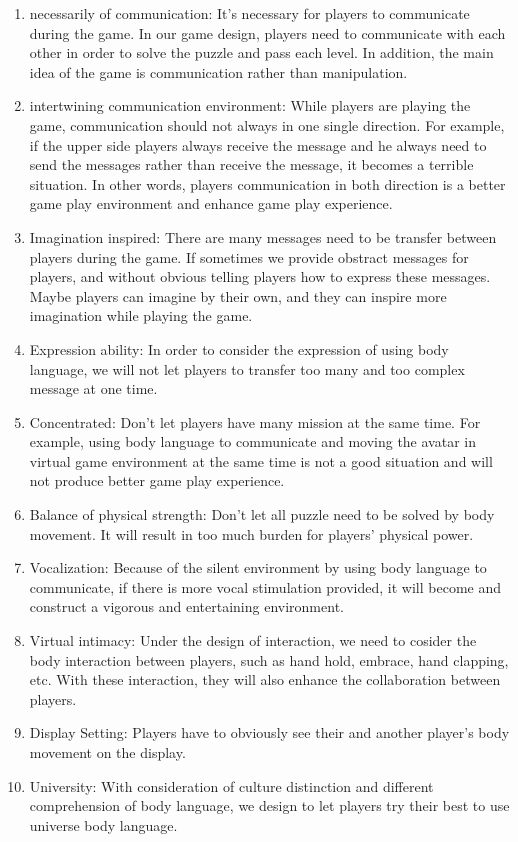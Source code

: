 \documentclass{sigchi}
\begin{document}
\begin{enumerate}
\item necessarily of communication: 
It's necessary for players to communicate during the game. In our game design, players need to communicate with each other in order to solve the puzzle and pass each level. In addition, the main idea of the game is communication rather than manipulation.
\item intertwining communication environment: While players are playing the game, communication should not always in one single direction. For example, if the upper side players always receive the message and he always need to send the messages rather than receive the message, it becomes a terrible situation. In other words, players communication in both direction is a better game play environment and enhance game play experience.
\item Imagination inspired:
There are many messages need to be transfer between players during the game. If sometimes we provide obstract messages for players, and without obvious telling players how to express these messages. Maybe players can imagine by their own, and they can inspire more imagination while playing the game.
\item Expression ability:
In order to consider the expression of using body language, we will not let players to transfer too many and too complex message at one time.
\item Concentrated:
Don't let players have many mission at the same time. For example, using body language to communicate and moving the avatar in virtual game environment at the same time is not a good situation and will not produce better game play experience.
\item Balance of physical strength:
Don't let all puzzle need to be solved by body movement. It will result in too much burden for players' physical power.
\item Vocalization: 
Because of the silent environment by using body language to communicate, if there is more vocal stimulation provided, it will become and construct a vigorous and entertaining environment.
\item Virtual intimacy:
Under the design of interaction, we need to cosider the body interaction between players, such as hand hold, embrace, hand clapping, etc. With these interaction, they will also enhance the collaboration between players.
\item Display Setting: 
Players have to obviously see their and another player's body movement on the display.
\item University:
With consideration of culture distinction and different comprehension of body language, we design to let players try their best to use universe body language.

\end{enumerate}
\end{document}
